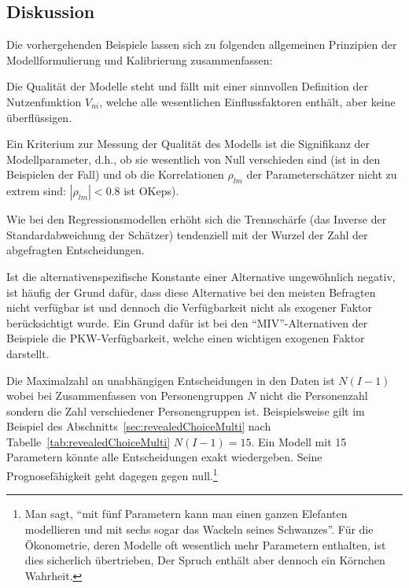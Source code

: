 \subsection{\label{sec:calibrDiskussion}Diskussion}
%
Die vorhergehenden Beispiele lassen sich zu folgenden allgemeinen
Prinzipien der Modellformulierung und Kalibrierung zusammenfassen:

\bi
\item Die Qualit\"at der Modelle steht und f\"allt mit einer
sinnvollen Definition der Nutzenfunktion $V_{ni}$, welche alle
wesentlichen Einflussfaktoren enth\"alt, aber keine
\"uber\-fl\"ussi\-gen.

\item Ein Kriterium zur Messung der Qualit\"at des Modells
 ist die Signifikanz der
Modellparameter, d.h., ob sie wesentlich von Null verschieden
sind (ist in den Beispielen der Fall) und ob die Korrelationen $\rho_{lm}$ der
Parametersch\"atzer nicht zu extrem  sind: $|\rho_{lm}|<0.8$ ist OKeps).

\item Wie bei den Regressionsmodellen erh\"oht sich die Trennsch\"arfe
  (das Inverse der Standardabweichung der Sch\"atzer)
  tendenziell mit der Wurzel der Zahl der abgefragten Entscheidungen.

\item Ist die alternativenspezifische Konstante einer Alternative
  ungew\"ohnlich negativ, ist h\"aufig der Grund daf\"ur, dass diese
  Alternative bei den meisten Befragten  nicht verf\"ugbar ist und dennoch die
  Verf\"ugbarkeit nicht als exogener Faktor ber\"ucksichtigt wurde.  Ein Grund
daf\"ur ist bei den ``MIV''-Alternativen der Beispiele die
 PKW-Verf\"ugbarkeit, welche einen
wichtigen exogenen Faktor darstellt.

\item Die Maximalzahl an unabh\"angigen Entscheidungen in den Daten
ist $N(I-1)$ wobei bei Zusammenfassen von Personengruppen $N$ nicht
die Personenzahl sondern die Zahl verschiedener Personengruppen ist. 
Beispielsweise gilt im Beispiel des
Abschnitts~\ref{sec:revealedChoiceMulti} nach
Tabelle~\ref{tab:revealedChoiceMulti} $N(I-1)=15$. Ein Modell mit 15
Parametern k\"onnte alle
Entscheidungen exakt wiedergeben. Seine Prognosef\"ahigkeit geht
dagegen gegen null.\footnote{Man sagt,
``mit f\"unf Parametern kann man einen ganzen Elefanten modellieren
und mit sechs sogar das Wackeln seines Schwanzes''. F\"ur die
\"Okonometrie, deren Modelle oft wesentlich mehr Parametern enthalten,
ist dies sicherlich 
\"ubertrieben, Der Spruch enth\"alt aber dennoch ein K\"ornchen Wahrheit.}

